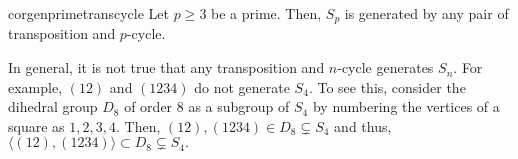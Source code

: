 \begin{restatable}[]{cor}{genprimetranscycle}
\label{cor:genprimetranscycle}
	Let $p \ge 3$ be a prime. Then, $S_p$ is generated by any pair of transposition and $p$-cycle. \hfill\hyperref[cor:genprimetranscycle2]{\downsym}
\end{restatable}

\begin{rem}
	In general, it is not true that any transposition and $n$-cycle generates $S_n.$ For example, $(12)$ and $(1234)$ do not generate $S_4.$ To see this, consider the dihedral group $D_8$ of order $8$ as a subgroup of $S_4$ by numbering the vertices of a square as $1, 2, 3, 4.$ Then, $(12), (1234) \in D_8 \subsetneq S_4$ and thus, $\langle (12), (1234)\rangle \subset D_8 \subsetneq S_4.$
\end{rem}